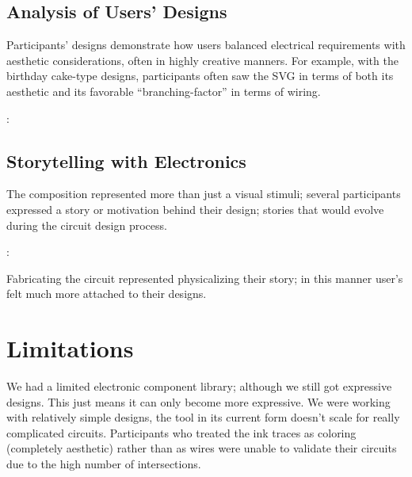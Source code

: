 \documentclass{sigchi}
\begin{document}
\subsection{Analysis of Users' Designs}
  Participants' designs demonstrate how users balanced electrical requirements with aesthetic considerations, often in highly creative manners. For example, with the birthday cake-type designs, participants often saw the SVG in terms of both its aesthetic and its favorable ``branching-factor'' in terms of wiring.
  
  \begin{myquote}
   \vspace{-2pt}
    :
    \vspace{-2pt}
  \end{myquote}
  
 

\subsection{Storytelling with Electronics}
  The composition represented more than just a visual stimuli; several participants expressed a story or motivation behind their design; stories that would evolve during the circuit design process.
  \begin{myquote}
   \vspace{-2pt}
    :
    \vspace{-2pt}
  \end{myquote}
  Fabricating the circuit represented physicalizing their story; in this manner user's felt much more attached to their designs.

\section{Limitations}
  We had a limited electronic component library; although we still got expressive designs. This just means it can only become more expressive. We were working with relatively simple designs, the tool in its current form doesn't scale for really complicated circuits. Participants who treated the ink traces as coloring (completely aesthetic) rather than as wires were unable to validate their circuits due to the high number of intersections.
\end{document}
